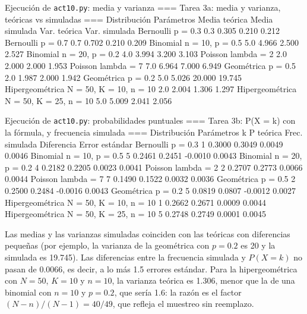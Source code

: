 \documentclass[11pt,letterpaper]{article}
\begin{document}
\begin{consola}[label=out:t3a]{Ejecución de \texttt{act10.py}: media y varianza}
=== Tarea 3a: media y varianza, teóricas vs simuladas ===
   Distribución             Parámetros  Media teórica  Media simulada  Var. teórica  Var. simulada
      Bernoulli                p = 0.3            0.3           0.305         0.210          0.212
      Bernoulli                p = 0.7            0.7           0.702         0.210          0.209
       Binomial        n = 10, p = 0.5            5.0           4.966         2.500          2.527
       Binomial        n = 20, p = 0.2            4.0           3.994         3.200          3.103
        Poisson             lambda = 2            2.0           2.000         2.000          1.953
        Poisson             lambda = 7            7.0           6.964         7.000          6.949
     Geométrica                p = 0.5            2.0           1.987         2.000          1.942
     Geométrica                p = 0.2            5.0           5.026        20.000         19.745
Hipergeométrica N = 50, K = 10, n = 10            2.0           2.004         1.306          1.297
Hipergeométrica N = 50, K = 25, n = 10            5.0           5.009         2.041          2.056
\end{consola}
\begin{consola}[label=out:t3b]{Ejecución de \texttt{act10.py}: probabilidades puntuales}
=== Tarea 3b: P(X = k) con la fórmula, y frecuencia simulada ===
   Distribución             Parámetros  k  P teórica  Frec. simulada  Diferencia  Error estándar
      Bernoulli                p = 0.3  1     0.3000          0.3049      0.0049          0.0046
       Binomial        n = 10, p = 0.5  5     0.2461          0.2451     -0.0010          0.0043
       Binomial        n = 20, p = 0.2  4     0.2182          0.2205      0.0023          0.0041
        Poisson             lambda = 2  2     0.2707          0.2773      0.0066          0.0044
        Poisson             lambda = 7  7     0.1490          0.1522      0.0032          0.0036
     Geométrica                p = 0.5  2     0.2500          0.2484     -0.0016          0.0043
     Geométrica                p = 0.2  5     0.0819          0.0807     -0.0012          0.0027
Hipergeométrica N = 50, K = 10, n = 10  1     0.2662          0.2671      0.0009          0.0044
Hipergeométrica N = 50, K = 25, n = 10  5     0.2748          0.2749      0.0001          0.0045
\end{consola}

Las medias y las varianzas simuladas coinciden con las teóricas con diferencias pequeñas (por ejemplo, la varianza de la geométrica con $p = 0.2$ es 20 y la simulada es 19.745). Las diferencias entre la frecuencia simulada y $P(X = k)$ no pasan de 0.0066, es decir, a lo más 1.5 errores estándar. Para la hipergeométrica con $N = 50$, $K = 10$ y $n = 10$, la varianza teórica es 1.306, menor que la de una binomial con $n = 10$ y $p = 0.2$, que sería 1.6: la razón es el factor $(N - n)/(N - 1) = 40/49$, que refleja el muestreo sin reemplazo.
\end{document}
